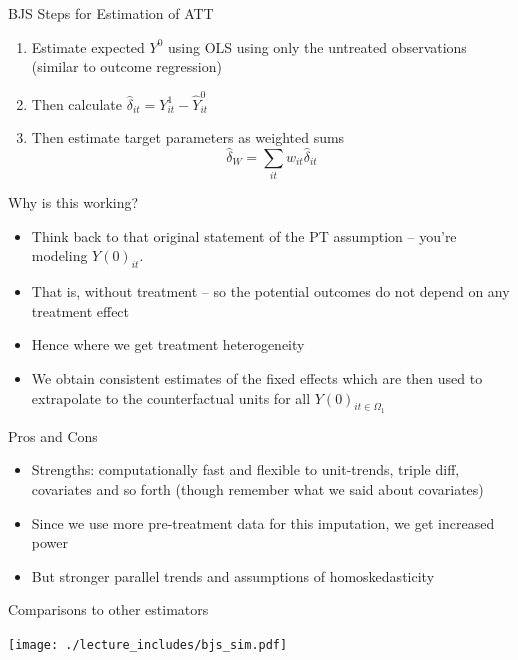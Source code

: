 \documentclass{beamer}
\begin{document}
\begin{frame}{BJS Steps for Estimation of ATT}

\begin{enumerate}
\item Estimate expected $Y^0$ using OLS using only the untreated observations (similar to outcome regression)
\item Then calculate $\widehat{\delta}_{it} = Y_{it}^1 - \widehat{Y}_{it}^0$
\item Then estimate target parameters as weighted sums$$\widehat{\delta}_W = \sum_{it}w_{it}\widehat{\delta}_{it}$$
\end{enumerate}



\end{frame}


\begin{frame}{Why is this working?}

\begin{itemize}
\item Think back to that original statement of the PT assumption -- you're modeling $Y(0)_{it}$. 
\item That is, without treatment -- so the potential outcomes do not depend on any treatment effect
\item Hence where we get treatment heterogeneity
\item We obtain consistent estimates of the fixed effects which are then used to extrapolate to the counterfactual units for all $Y(0)_{it \in \Omega_1}$
\end{itemize}

\end{frame}

\begin{frame}{Pros and Cons}

\begin{itemize}
\item Strengths: computationally fast and flexible to unit-trends, triple diff, covariates and so forth (though remember what we said about covariates)
\item Since we use more pre-treatment data for this imputation, we get increased power
\item But stronger parallel trends and assumptions of homoskedasticity
\end{itemize}

\end{frame}



\begin{frame}{Comparisons to other estimators}

\begin{center}
\texttt{[image: ./lecture\_includes/bjs\_sim.pdf]}
\end{center}

\end{frame}
\end{document}

